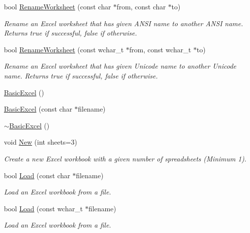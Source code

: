 \begin{DoxyCompactItemize}
bool \hyperlink{class_y_excel_1_1_basic_excel_a791f06c754f67e2e010052f65a7f4651}{Rename\+Worksheet} (const char $\ast$from, const char $\ast$to)
\begin{DoxyCompactList}\small\item\em Rename an Excel worksheet that has given A\+N\+S\+I name to another A\+N\+S\+I name. Returns true if successful, false if otherwise. \end{DoxyCompactList}\item 
bool \hyperlink{class_y_excel_1_1_basic_excel_a63323de30c5e426f225d57dac5f243ff}{Rename\+Worksheet} (const wchar\+\_\+t $\ast$from, const wchar\+\_\+t $\ast$to)
\begin{DoxyCompactList}\small\item\em Rename an Excel worksheet that has given Unicode name to another Unicode name. Returns true if successful, false if otherwise. \end{DoxyCompactList}\item 
\hyperlink{class_y_excel_1_1_basic_excel_ad2cb116dc96aa380399de4c1d0a93eb7}{Basic\+Excel} ()
\item 
\hyperlink{class_y_excel_1_1_basic_excel_ade0a7e1f99dc56cea809c7db31b34f05}{Basic\+Excel} (const char $\ast$filename)
\item 
\hyperlink{class_y_excel_1_1_basic_excel_a5f0fba85f6f0d10706430f0f00f93945}{$\sim$\+Basic\+Excel} ()
\item 
void \hyperlink{class_y_excel_1_1_basic_excel_a61cbf0e9d5bca97c10df212f8219b6f1}{New} (int sheets=3)
\begin{DoxyCompactList}\small\item\em Create a new Excel workbook with a given number of spreadsheets (Minimum 1). \end{DoxyCompactList}\item 
bool \hyperlink{class_y_excel_1_1_basic_excel_a7dc1a3b9d95654129f0ada8eb0d6ea28}{Load} (const char $\ast$filename)
\begin{DoxyCompactList}\small\item\em Load an Excel workbook from a file. \end{DoxyCompactList}\item 
bool \hyperlink{class_y_excel_1_1_basic_excel_a66b588c8f1d1aae6a6a03d57d5a15cf5}{Load} (const wchar\+\_\+t $\ast$filename)
\begin{DoxyCompactList}\small\item\em Load an Excel workbook from a file. \end{DoxyCompactList}\item 

\end{DoxyCompactItemize}
